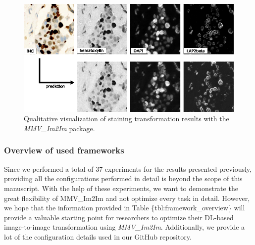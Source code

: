 \begin{figure}
\hypertarget{fig:multiplex}{%
\centering
\includegraphics{images/multiplex_justin.png}
\caption{Qualitative visualization of staining transformation results with the \emph{MMV\_Im2Im} package.}\label{fig:multiplex}
}
\end{figure}

\hypertarget{overview-of-used-frameworks}{%
\subsubsection{Overview of used frameworks}\label{overview-of-used-frameworks}}

Since we performed a total of 37 experiments for the results presented previously, providing all the configurations performed in detail is beyond the scope of this manuscript. With the help of these experiments, we want to demonstrate the great flexibility of MMV\_Im2Im and not optimize every task in detail. However, we hope that the information provided in Table \{tbl:framework\_overview\} will provide a valuable starting point for researchers to optimize their DL-based image-to-image transformation using \emph{MMV\_Im2Im}. Additionally, we provide a lot of the configuration details used in our GitHub repository.

